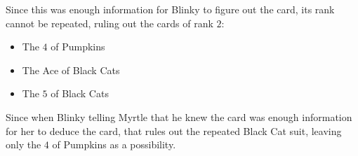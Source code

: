 Since this was enough information for Blinky to figure out the card, its
rank cannot be repeated, ruling out the cards of rank \(2\):

\begin{itemize}
  \item The \(4\) of Pumpkins
  \item The Ace of Black Cats
  \item The \(5\) of Black Cats
\end{itemize}

Since when Blinky telling Myrtle that he knew the card was enough information
for her to deduce the card, that rules out the repeated Black Cat suit,
leaving only the \(4\) of Pumpkins as a possibility.
